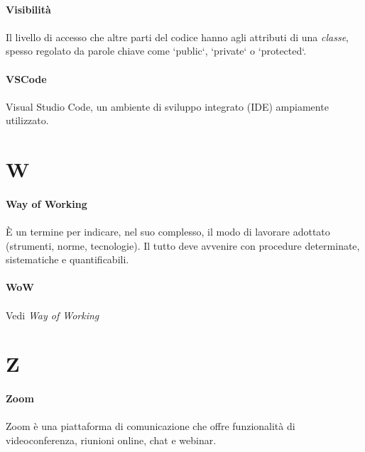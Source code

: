 \documentclass[10pt, a4paper]{article}
\begin{document}
\vspace{2em}
\paragraph{Visibilità}\noindent\hrulefill
\paragraph{}Il livello di accesso che altre parti del codice hanno agli attributi di una \textit{classe\pg}, spesso regolato da parole chiave come `public`, `private` o `protected`.

\vspace{2em}
\paragraph{VSCode}\noindent\hrulefill
\paragraph{}Visual Studio Code, un ambiente di sviluppo integrato (IDE) ampiamente utilizzato.


\newpage
\section{W}

\vspace{2em}
\paragraph{Way of Working}\noindent\hrulefill
\paragraph{}È un termine per indicare, nel suo complesso, il modo di lavorare adottato (strumenti, norme, tecnologie). Il tutto deve avvenire con procedure determinate, sistematiche e quantificabili.   

\vspace{2em}
\paragraph{WoW}\noindent\hrulefill
\paragraph{}Vedi \textit{Way of Working\pg}

\newpage
\section{Z}
\vspace{2em}
\paragraph{Zoom}\noindent\hrulefill
\paragraph{}Zoom è una piattaforma di comunicazione che offre funzionalità di videoconferenza, riunioni online, chat e webinar.
\end{document}
